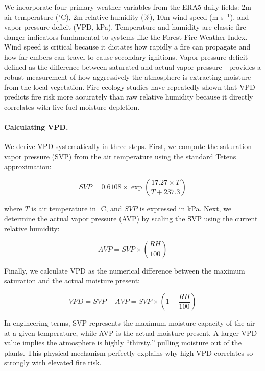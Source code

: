 \documentclass[11pt]{article}
\begin{document}
We incorporate four primary weather variables from the ERA5 daily fields: 2m air temperature ($^\circ$C), 2m relative humidity (\%), 10m wind speed (m s$^{-1}$), and vapor pressure deficit (VPD, kPa). Temperature and humidity are classic fire-danger indicators fundamental to systems like the Forest Fire Weather Index. Wind speed is critical because it dictates how rapidly a fire can propagate and how far embers can travel to cause secondary ignitions. Vapor pressure deficit---defined as the difference between saturated and actual vapor pressure---provides a robust measurement of how aggressively the atmosphere is extracting moisture from the local vegetation. Fire ecology studies have repeatedly shown that VPD predicts fire risk more accurately than raw relative humidity because it directly correlates with live fuel moisture depletion.

\medskip
\paragraph{Calculating VPD.} We derive VPD systematically in three steps. First, we compute the saturation vapor pressure (SVP) from the air temperature using the standard Tetens approximation:

\begin{equation}
SVP = 0.6108 \times \exp\left(\frac{17.27 \times T}{T + 237.3}\right)
\end{equation}

where $T$ is air temperature in $^\circ$C, and $SVP$ is expressed in kPa. Next, we determine the actual vapor pressure (AVP) by scaling the SVP using the current relative humidity:

\begin{equation}
AVP = SVP \times \left(\frac{RH}{100}\right)
\end{equation}

Finally, we calculate VPD as the numerical difference between the maximum saturation and the actual moisture present:

\begin{equation}
VPD = SVP - AVP = SVP \times \left(1 - \frac{RH}{100}\right)
\end{equation}

In engineering terms, SVP represents the maximum moisture capacity of the air at a given temperature, while AVP is the actual moisture present. A larger VPD value implies the atmosphere is highly ``thirsty,'' pulling moisture out of the plants. This physical mechanism perfectly explains why high VPD correlates so strongly with elevated fire risk.
\end{document}
